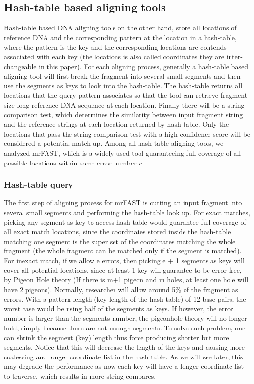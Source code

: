 \subsection{Hash-table based aligning tools} 

Hash-table based DNA aligning tools on the other hand, store all locations of
reference DNA and the corresponding pattern at the location in a hash-table,
where the pattern is the key and the corresponding locations are contends
associated with each key (the locations is also called coordinates they are
inter-changeable in this paper). For each aligning process, generally a
hash-table based aligning tool will first break the fragment into several small
segments and then use the segments as keys to look into the hash-table. The
hash-table returns all locations that the query pattern associates so that the
tool can retrieve fragment-size long reference DNA sequence at each location.
Finally there will be a string comparison test, which determines the similarity
between input fragment string and the reference strings at each location
returned by hash-table. Only the locations that pass the string comparison test
with a high confidence score will be considered a potential match up.  Among
all hash-table aligning tools, we analyzed mrFAST, which is a widely used tool
guaranteeing full coverage of all possible locations within some error number
\textit{e}.  

\subsubsection{Hash-table query} 

The first step of aligning process for mrFAST is cutting an input fragment into
several small segments and performing the hash-table look up. For exact
matches, picking any segment as key to access hash-table would guarantee full
coverage of all exact match locations, since the coordinates stored inside the
hash-table matching one segment is the super set of the coordinates matching
the whole fragment (the whole fragment can be matched only if the segment is
matched).  For inexact match, if we allow e errors, then picking e + 1 segments
as keys will cover all potential locations, since at least 1 key will guarantee
to be error free, by Pigeon Hole theory (If there is m+1 pigeon and m holes, at
least one hole will have 2 pigeons).  Normally, researcher will allow around 5\%
of the fragment as errors. With a pattern length (key length of the hash-table)
of 12 base pairs, the worst case would be using half of the segments as keys.
If however, the error number is larger than the segments number, the pigeonhole
theory will no longer hold, simply because there are not enough segments. To
solve such problem, one can shrink the segment (key) length thus force
producing shorter but more segments.  Notice that this will decrease the length
of the keys and causing more coalescing and longer coordinate list in the hash
table. As we will see later, this may degrade the performance as now each key
will have a longer coordinate list to traverse, which results in more string
compares. \\


